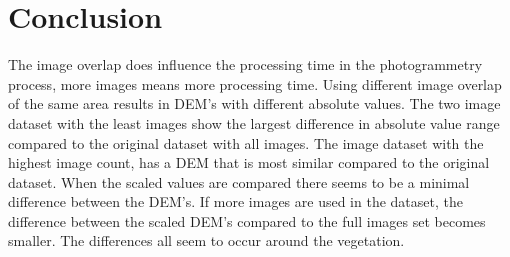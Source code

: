 \documentclass{isprs} %
\begin{document}
\section{Conclusion}
The image overlap does influence the processing time in the photogrammetry process, more images means more processing time.
Using different image overlap of the same area results in DEM's with different absolute values.
The two image dataset with the least images show the largest difference in absolute value range compared to the original dataset with all images.
The image dataset with the highest image count, has a DEM that is most similar compared to the original dataset.
When the scaled values are compared there seems to be a minimal difference between the DEM's.
If more images are used in the dataset, the difference between the scaled DEM's compared to the full images set becomes smaller.
The differences all seem to occur around the vegetation.


\sloppy




{
	\begin{spacing}{1.17}
		\normalsize
	\end{spacing}
}



\vspace{1cm}
\end{document}
